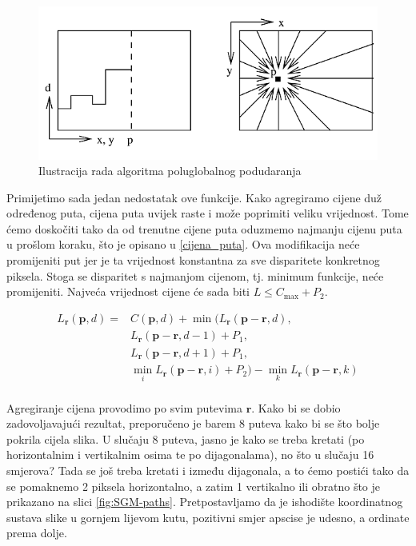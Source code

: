 \documentclass[utf8, zavrsni, numeric]{fer}
\begin{document}
\begin{figure}[H]
  \centering
  \includegraphics[width=12cm]{img/sgm.png}
  \caption{Ilustracija rada algoritma poluglobalnog podudaranja}
  \label{fig:SGM}
\end{figure}


Primijetimo sada jedan nedostatak ove funkcije. Kako agregiramo cijene duž određenog puta, cijena puta uvijek raste i može poprimiti veliku vrijednost. Tome ćemo doskočiti tako da od trenutne cijene puta oduzmemo najmanju cijenu puta u prošlom koraku, što je opisano u \ref{cijena_puta}.
Ova modifikacija neće promijeniti put jer je ta vrijednost konstantna za sve disparitete konkretnog piksela. Stoga se disparitet s najmanjom cijenom, tj. minimum funkcije, neće promijeniti.
Najveća vrijednost cijene će sada biti $L \leq C_{\max} + P_2$.

\begin{equation} \label{cijena_puta}
  \begin{split}
    L_{\mathbf{r}}(\mathbf{p}, d) = & C(\mathbf{p}, d) + \min(L_{\mathbf{r}}(\mathbf{p} - \mathbf{r}, d), \\
    & L_{\mathbf{r}}(\mathbf{p} - \mathbf{r}, d - 1) + P_1, \\
    & L_{\mathbf{r}}(\mathbf{p} - \mathbf{r}, d + 1) + P_1, \\
    & \min\limits_{i} L_{\mathbf{r}}(\mathbf{p} - \mathbf{r}, i) + P_2) - \min\limits_{k}L_{\mathbf{r}}(\mathbf{p} - \mathbf{r}, k) \\
  \end{split}
\end{equation}

Agregiranje cijena provodimo po svim putevima $\mathbf{r}$. Kako bi se dobio zadovoljavajući rezultat,
preporučeno je barem 8 puteva kako bi se što bolje pokrila cijela slika. U slučaju 8 puteva, jasno je kako se treba kretati (po horizontalnim i vertikalnim osima te po dijagonalama), no što u slučaju 16 smjerova?
Tada se još treba kretati i između dijagonala, a to ćemo postići tako da se pomaknemo 2 piksela horizontalno, a zatim 1 vertikalno ili obratno što je prikazano na slici \ref{fig:SGM-paths}. Pretpostavljamo da je ishodište koordinatnog sustava slike u gornjem lijevom kutu, pozitivni smjer apscise je udesno, a ordinate prema dolje.
\end{document}
